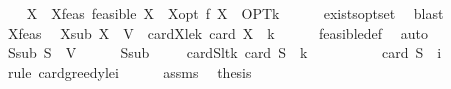 \begin{isabellebody}
\isanewline
\ \ \isamarkupfalse%
\ X\ \ X{\isacharunderscore}{\kern0pt}feas{\isacharcolon}{\kern0pt}\ {\isachardoublequoteopen}feasible\ X{\isachardoublequoteclose}\ \ X{\isacharunderscore}{\kern0pt}opt{\isacharcolon}{\kern0pt}\ {\isachardoublequoteopen}f\ X\ {\isacharequal}{\kern0pt}\ OPT{\isacharunderscore}{\kern0pt}k{\isachardoublequoteclose}\isanewline
\ \ \ \ \isamarkupfalse%
\ exists{\isacharunderscore}{\kern0pt}opt{\isacharunderscore}{\kern0pt}set\ \isamarkupfalse%
\ blast\isanewline
\ \ \isamarkupfalse%
\ X{\isacharunderscore}{\kern0pt}feas\ \isamarkupfalse%
\ X{\isacharunderscore}{\kern0pt}sub{\isacharcolon}{\kern0pt}\ {\isachardoublequoteopen}X\ {\isasymsubseteq}\ V{\isachardoublequoteclose}\ \ cardX{\isacharunderscore}{\kern0pt}le{\isacharunderscore}{\kern0pt}k{\isacharcolon}{\kern0pt}\ {\isachardoublequoteopen}card\ X\ {\isasymle}\ k{\isachardoublequoteclose}\isanewline
\ \ \ \ \isamarkupfalse%
\ feasible{\isacharunderscore}{\kern0pt}def\ \isamarkupfalse%
\ auto\isanewline
\isanewline
\ \ \isamarkupfalse%
\ S{\isacharunderscore}{\kern0pt}sub{\isacharprime}{\kern0pt}{\isacharcolon}{\kern0pt}\ {\isachardoublequoteopen}{\isacharquery}{\kern0pt}S\ {\isasymsubseteq}\ V{\isachardoublequoteclose}\isanewline
\ \ \ \ \isamarkupfalse%
\ S{\isacharunderscore}{\kern0pt}sub\ \isakeywordONE{{\isachardot}{\kern0pt}}\isamarkupfalse%
\isanewline
\isanewline
\ \ \isamarkupfalse%
\ cardS{\isacharunderscore}{\kern0pt}lt{\isacharunderscore}{\kern0pt}k{\isacharcolon}{\kern0pt}\ {\isachardoublequoteopen}card\ {\isacharquery}{\kern0pt}S\ {\isacharless}{\kern0pt}\ k{\isachardoublequoteclose}\isanewline
\ \ \isamarkupfalse%
\ {\isacharminus}{\kern0pt}\isanewline
\ \ \ \ \isamarkupfalse%
\ {\isachardoublequoteopen}card\ {\isacharquery}{\kern0pt}S\ {\isasymle}\ i{\isachardoublequoteclose}\isanewline
\ \ \ \ \ \ \isamarkupfalse%
\ {\isacharparenleft}{\kern0pt}rule\ card{\isacharunderscore}{\kern0pt}greedy{\isacharunderscore}{\kern0pt}le{\isacharunderscore}{\kern0pt}i{\isacharparenright}{\kern0pt}\isanewline
\ \ \ \ \isamarkupfalse%
\ assms{\isacharparenleft}{\kern0pt}{}{\isacharparenright}{\kern0pt}\ \isamarkupfalse%
\ {\isacharquery}{\kern0pt}thesis\isanewline
\ \ \ \ \ \ \isamarkupfalse%

\end{isabellebody}
